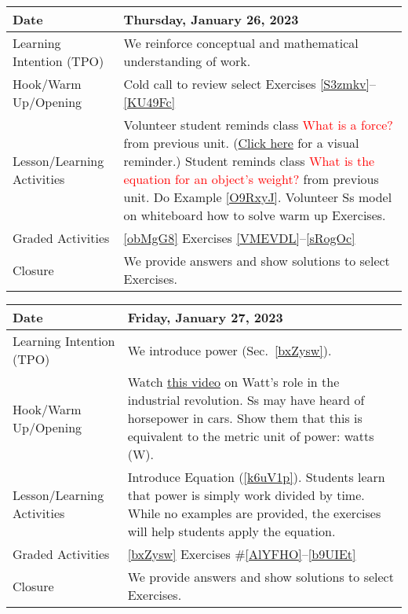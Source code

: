 \documentclass[main.tex]{subfiles}
\begin{document}
\begin{tabular}{|m{}|m{}|}
    \hline  
    \cellcolor{black!20}\textbf{Date} &
    \cellcolor{black!20}\textbf{Thursday, January 26, 2023} \\
    \hline
    Learning Intention (TPO) &  We reinforce conceptual and mathematical understanding of work.\\
    \hline
    Hook/Warm Up/Opening & Cold call to review select Exercises \ref{S3zmkv}--\ref{KU49Fc}\\
    \hline
    Lesson/Learning Activities & Volunteer student reminds class \textcolor{red}{What is a force?} from previous unit. (\href{https://phet.colorado.edu/en/simulations/forces-and-motion-basics}{Click here} for a visual reminder.) Student reminds class \textcolor{red}{What is the equation for an object's weight?} from previous unit. Do Example \ref{O9RxyJ}. Volunteer Ss model on whiteboard how to solve warm up Exercises.\\
    \hline
    Graded Activities & \ref{obMgG8} Exercises \ref{VMEVDL}--\ref{sRogOc} \\
    \hline
    Closure & We provide answers and show solutions to select Exercises.\\  
    \hline
\end{tabular} 

\begin{tabular}{|m{}|m{}|}
    \hline  
    \cellcolor{black!20}\textbf{Date} &
    \cellcolor{black!20}\textbf{Friday, January 27, 2023} \\
    \hline
    Learning Intention (TPO) & We introduce \gls{power} (Sec.~\ref{bxZysw}). \\
    \hline
    Hook/Warm Up/Opening & Watch \href{https://youtu.be/zhL5DCizj5c}{this video} on Watt's role in the industrial revolution. Ss may have heard of horsepower in cars. Show them that this is equivalent to the metric unit of power: watts (W). \\
    \hline
    Lesson/Learning Activities & Introduce Equation (\ref{k6uV1p}). Students learn that power is simply work divided by time. While no examples are provided, the exercises will help students apply the equation.\\
    \hline
    Graded Activities & \ref{bxZysw} Exercises \#\ref{AlYFHO}--\ref{b9UIEt} \\
    \hline
    Closure & We provide answers and show solutions to select Exercises.\\  
    \hline
\end{tabular}
\end{document}
